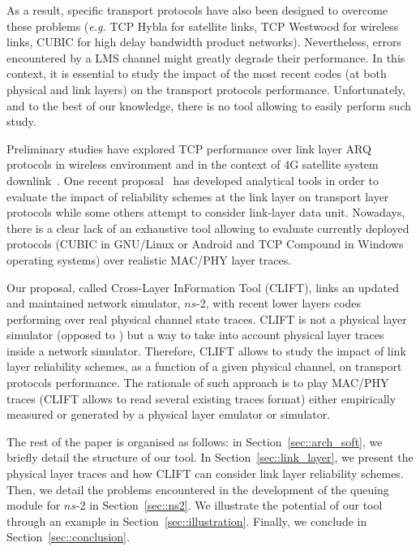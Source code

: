 \documentclass[conference,letterpaper]{IEEEtran}
\begin{document}
As a result, specific transport protocols have also been designed to overcome these problems (\textit{e.g.} TCP Hybla for satellite links, TCP Westwood for wireless links, CUBIC for high delay bandwidth product networks). Nevertheless, errors encountered by a LMS channel might greatly degrade their performance. In this context, it is essential to study the impact of the most recent codes (at both physical and link layers) on the transport protocols performance. Unfortunately, and to the best of our knowledge, there is no tool allowing to easily perform such study.  

Preliminary studies have explored TCP performance over link layer ARQ protocols in wireless environment \cite{tcp_arq_1,tcp_arq_2} and in the context of 4G satellite system downlink~\cite{tcp_4G}. One recent proposal~\cite{aimd} has developed analytical tools in order to evaluate the impact of reliability schemes at the link layer on transport layer protocols while some others \cite{ll_ns2,barakat_fec_arq} attempt to consider link-layer data unit.
Nowadays, there is a clear lack of an exhaustive tool allowing to evaluate currently deployed protocols (CUBIC in GNU/Linux or Android and TCP Compound in Windows operating systems) over realistic MAC/PHY layer traces.

Our proposal, called Cross-Layer InFormation Tool (CLIFT), links an updated and maintained network simulator, $ns$-2, with recent lower layers codes performing over real physical channel state traces. CLIFT is not a physical layer simulator (opposed to \cite{ns-3}) but a way to take into account physical layer traces inside a network simulator. Therefore, CLIFT allows to study the impact of link layer reliability schemes, as a function of a given physical channel, on transport protocols performance. The rationale of such approach is to play MAC/PHY traces (CLIFT allows to read several existing traces format) either empirically measured or generated by a physical layer emulator or simulator.




The rest of the paper is organised as follows: in Section~\ref{sec::arch_soft}, we briefly detail the structure of our tool. In Section~\ref{sec::link_layer}, we present the physical layer traces and how CLIFT can consider link layer reliability schemes. Then, we detail the problems encountered in the development of the queuing module for $ns$-2 in Section~\ref{sec::ns2}. We illustrate the potential of our tool through an example in Section~\ref{sec::illustration}. Finally, we conclude in Section~\ref{sec::conclusion}.
\end{document}
